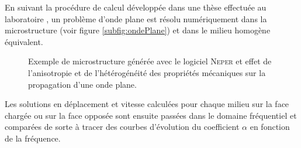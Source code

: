 En suivant la procédure de calcul développée dans une thèse effectuée au laboratoire \cite{Bai2018-noise}, un problème d'onde plane est résolu numériquement dans la microstructure (voir figure \ref{subfig:ondePlane}) et dans le milieu homogène équivalent.
\begin{figure}[h!]
  \centering
  \caption{Exemple de microstructure générée avec le logiciel \textsc{Neper} et effet de l'anisotropie et de l'hétérogénéité des propriétés mécaniques sur la propagation d'une onde plane.}
  \label{fig:microStruct}
\end{figure}
Les solutions en déplacement et vitesse calculées pour chaque milieu sur la face chargée ou sur la face opposée sont ensuite passées dans le domaine fréquentiel et comparées de sorte à tracer des courbes d'évolution du coefficient $\alpha$ en fonction de la fréquence.

